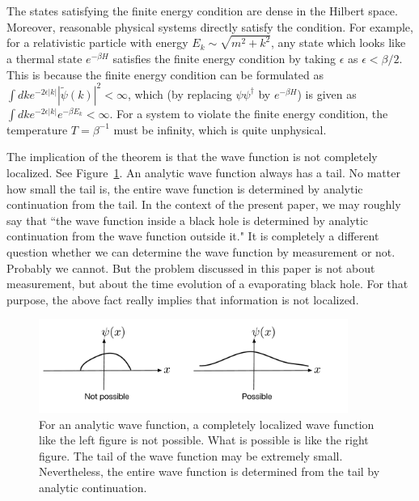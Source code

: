 \documentclass[a4paper,11pt]{article}
\theoremstyle{plain}
\theoremstyle{definition}
\numberwithin{thm}{section}
\begin{document}
The states satisfying the finite energy condition are dense in the Hilbert space. Moreover, reasonable physical systems directly satisfy the condition.
For example, for a relativistic particle with energy $E_k \sim \sqrt{m^2+k^2}$, any state which looks like a thermal state $e^{-\beta H}$ satisfies the finite energy condition
by taking $\epsilon $ as $\epsilon <\beta/2$. This is because the finite energy condition can be formulated as $\int dk e^{-2\epsilon |k|}  |\widetilde{\psi}(k)|^2 < \infty $,
which (by replacing $\psi \psi^\dagger$ by $e^{ - \beta H}$) is given as $\int dk e^{-2\epsilon |k|}  e^{- \beta E_k} < \infty $.
For a system to violate the finite energy condition, the temperature $T=\beta^{-1}$ must be infinity, which is quite unphysical. 

The implication of the theorem is that the wave function is not completely localized.
See Figure~\ref{fig:loc}. An analytic wave function always has a tail.
No matter how small the tail is, the entire wave function is determined by analytic continuation from the tail. 
In the context of the present paper, we may roughly say that ``the wave function inside a black hole is determined by analytic continuation from the wave function
outside it." It is completely a different question whether we can determine the wave function by measurement or not. Probably we cannot.
But the problem discussed in this paper is not about measurement, but about the time evolution of a evaporating black hole.
For that purpose, the above fact really implies that information is not localized.
\begin{figure}
\centering
\includegraphics[width=0.9\textwidth]{localized}
\caption{ For an analytic wave function, a completely localized wave function like the left figure is not possible.
What is possible is like the right figure. The tail of the wave function may be extremely small. Nevertheless,
the entire wave function is determined from the tail by analytic continuation.
 \label{fig:loc}}
\end{figure}
\end{document}
